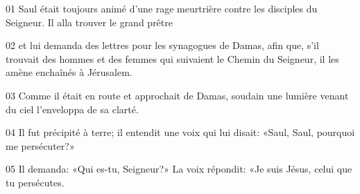 01 Saul était toujours animé d’une rage meurtrière contre les disciples du Seigneur. Il alla trouver le grand prêtre

02 et lui demanda des lettres pour les synagogues de Damas, afin que, s’il trouvait des hommes et des femmes qui suivaient le Chemin du Seigneur, il les amène enchaînés à Jérusalem.

03 Comme il était en route et approchait de Damas, soudain une lumière venant du ciel l’enveloppa de sa clarté.

04 Il fut précipité à terre; il entendit une voix qui lui disait: «Saul, Saul, pourquoi me persécuter?»

05 Il demanda: «Qui es-tu, Seigneur?» La voix répondit: «Je suis Jésus, celui que tu persécutes.
